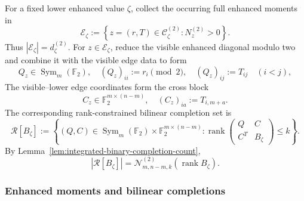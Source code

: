\documentclass[11pt]{article}
\newcommand{\F}{\mathbb F}
\newcommand{\Sym}{\operatorname{Sym}}
\newcommand{\rank}{\operatorname{rank}}
\newcommand{\1}{\mathbf 1}
\theoremstyle{plain}
\theoremstyle{definition}
\theoremstyle{remark}
\begin{document}
For a fixed lower enhanced value $\zeta$, collect the occurring full enhanced
moments in
\begin{equation}
 \mathcal E_\zeta
 :=\left\{z=(r,T)\in\mathcal C_\zeta^{(2)}:
                 N_z^{(2)}>0\right\}.
 \label{eq:binary-enhanced-occurring-set}
\end{equation}
Thus $|\mathcal E_\zeta|=d_\zeta^{(2)}$.  For $z\in\mathcal E_\zeta$, reduce the visible enhanced diagonal modulo two
and combine it with the visible edge data to form
\begin{equation}
 Q_z\in\Sym_m(\F_2),
 \quad
 (Q_z)_{ii}:=r_i\pmod2,
 \quad
 (Q_z)_{ij}:=T_{ij}\quad(i<j),
 \label{eq:binary-visible-bilinear-block}
\end{equation}
The visible--lower edge coordinates form the cross block
\begin{equation}
 C_z\in\F_2^{m\times(n-m)},
 \quad
 (C_z)_{ia}:=T_{i,m+a}.
 \label{eq:binary-cross-bilinear-block}
\end{equation}
The corresponding rank-constrained bilinear completion set is
\begin{equation}
 \mathcal R[B_\zeta]
 :=\left\{(Q,C)\in\Sym_m(\F_2)\times
                   \F_2^{m\times(n-m)}:
 \rank\begin{pmatrix}Q&C\\C^T&B_\zeta\end{pmatrix}\le k
 \right\}.
 \label{eq:binary-shadow-completion-set}
\end{equation}
By Lemma~\ref{lem:integrated-binary-completion-count},
\begin{equation}
 |\mathcal R[B_\zeta]|
 =\mathcal N_{m,n-m,k}^{(2)}(\rank B_\zeta).
 \label{eq:binary-shadow-completion-cardinality}
\end{equation}

\subsubsection{Enhanced moments and bilinear completions}
\label{subsubsec:enhanced-bilinear-comparison}
\end{document}
